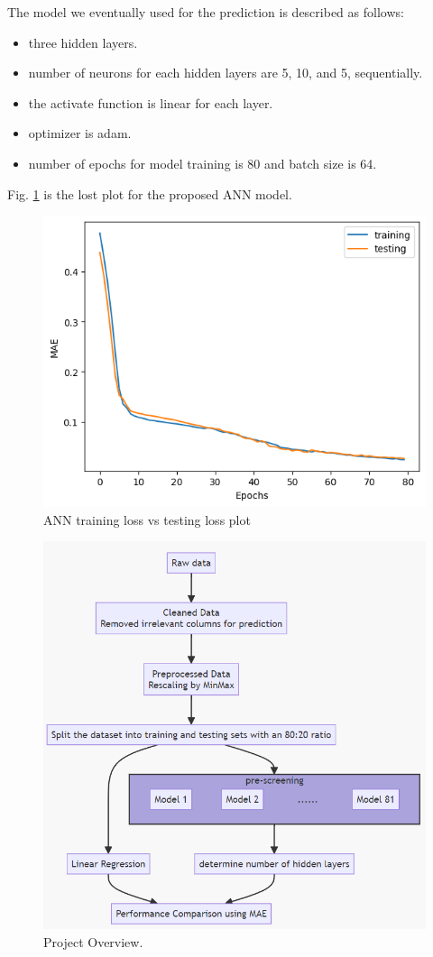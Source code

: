 \documentclass[sigplan,screen]{acmart}
\begin{document}
The model we eventually used for the prediction is described as follows:

\begin{itemize}
  \item three hidden layers.
  \item number of neurons for each hidden layers are 5, 10, and 5, sequentially.
  \item the activate function is linear for each layer.
  \item optimizer is adam.
  \item number of epochs for model training is 80 and batch size is 64. 
\end{itemize}

Fig. \ref{fig:training} is the lost plot for the proposed ANN model.

\begin{figure}[h]
  \centering
  \includegraphics[width=0.8\linewidth]{training.png}
  \caption{ANN training loss vs testing loss plot}
  \label{fig:training}
\end{figure}


\begin{figure}[h]
  \centering
  \includegraphics[width=0.8\linewidth]{flowchart.png}
  \caption{Project Overview.}
  \label{fig:flowchart}
\end{figure}
\end{document}
